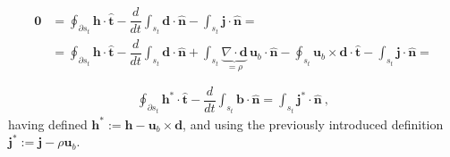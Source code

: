 \documentclass[letterpaper,10pt,italian]{jupyterBook}
\begin{document}
\sphinxAtStartPar
{}
\begin{equation*}
\begin{split}\begin{aligned}
    \mathbf{0} & = \oint_{\partial s_t} \mathbf{h} \cdot \hat{\mathbf{t}} - \dfrac{d}{dt} \int_{s_t} \mathbf{d} \cdot \hat{\mathbf{n}} - \int_{s_t} \mathbf{j} \cdot \hat{\mathbf{n}} = \\
    & = \oint_{\partial s_t} \mathbf{h} \cdot \hat{\mathbf{t}} - \dfrac{d}{dt} \int_{s_t} \mathbf{d} \cdot \hat{\mathbf{n}} + \int_{s_t} \underbrace{\nabla \cdot \mathbf{d}}_{=\rho} \, \mathbf{u}_b \cdot \hat{\mathbf{n}} - \oint_{s_t} \mathbf{u}_b \times \mathbf{d} \cdot \hat{\mathbf{t}} - \int_{s_t} \mathbf{j} \cdot \hat{\mathbf{n}} =  \\
\end{aligned}\end{split}
\end{equation*}\begin{equation*}
\begin{split}
    \oint_{\partial s_t} \mathbf{h}^* \cdot \hat{\mathbf{t}} - \dfrac{d}{dt} \int_{s_t} \mathbf{b} \cdot \hat{\mathbf{n}} = \int_{s_t} \mathbf{j}^* \cdot \hat{\mathbf{n}} \ ,
\end{split}
\end{equation*}
\sphinxAtStartPar
having defined \(\mathbf{h}^* := \mathbf{h} - \mathbf{u}_b \times \mathbf{d}\), and using the previously introduced definition \(\mathbf{j}^* := \mathbf{j} - \rho \mathbf{u}_b\).
\end{document}
